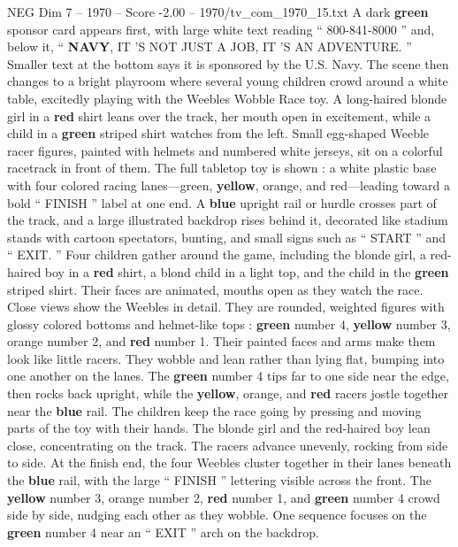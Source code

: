 \begin{textsample}{NEG Dim 7 – 1970 – Score -2.00 – 1970/tv\_com\_1970\_15.txt}  \label{ex:f7_neg_067}
A dark \textbf{green} sponsor card appears first, with large white text reading “ 800-841-8000 ” and, below it, “ \textbf{NAVY}, IT ’S NOT JUST A JOB, IT ’S AN ADVENTURE. ” Smaller text at the bottom says it is sponsored by the U.S.
Navy.
The scene then changes to a bright playroom where several young children crowd around a white table, excitedly playing with the Weebles Wobble Race toy.
A long-haired blonde girl in a \textbf{red} shirt leans over the track, her mouth open in excitement, while a child in a \textbf{green} striped shirt watches from the left.
Small egg-shaped Weeble racer figures, painted with helmets and numbered white jerseys, sit on a colorful racetrack in front of them.
The full tabletop toy is shown : a white plastic base with four colored racing lanes—green, \textbf{yellow}, orange, and red—leading toward a bold “ FINISH ” label at one end.
A \textbf{blue} upright rail or hurdle crosses part of the track, and a large illustrated backdrop rises behind it, decorated like stadium stands with cartoon spectators, bunting, and small signs such as “ START ” and “ EXIT. ” Four children gather around the game, including the blonde girl, a red-haired boy in a \textbf{red} shirt, a blond child in a light top, and the child in the \textbf{green} striped shirt.
Their faces are animated, mouths open as they watch the race.
Close views show the Weebles in detail.
They are rounded, weighted figures with glossy colored bottoms and helmet-like tops : \textbf{green} number 4, \textbf{yellow} number 3, orange number 2, and \textbf{red} number 1.
Their painted faces and arms make them look like little racers.
They wobble and lean rather than lying flat, bumping into one another on the lanes.
The \textbf{green} number 4 tips far to one side near the edge, then rocks back upright, while the \textbf{yellow}, orange, and \textbf{red} racers jostle together near the \textbf{blue} rail.
The children keep the race going by pressing and moving parts of the toy with their hands.
The blonde girl and the red-haired boy lean close, concentrating on the track.
The racers advance unevenly, rocking from side to side.
At the finish end, the four Weebles cluster together in their lanes beneath the \textbf{blue} rail, with the large “ FINISH ” lettering visible across the front.
The \textbf{yellow} number 3, orange number 2, \textbf{red} number 1, and \textbf{green} number 4 crowd side by side, nudging each other as they wobble.
One sequence focuses on the \textbf{green} number 4 near an “ EXIT ” arch on the backdrop.

\end{textsample}
